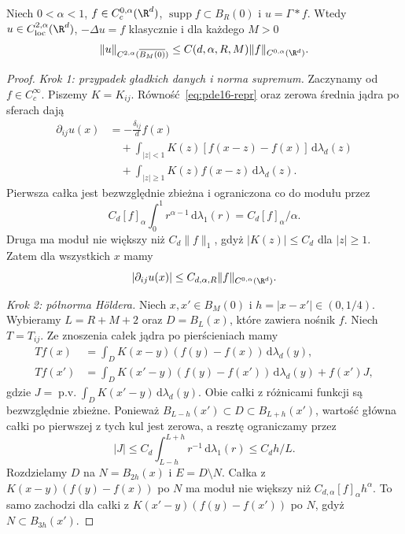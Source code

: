 \begin{lemat}
\label{lem:pde16-newton-holder}
Niech $0<\alpha<1$, $f\in C_c^{0,\alpha}(\R^d)$,
$\operatorname{supp}f\subset B_R(0)$ i $u=\Gamma*f$.
Wtedy $u\in C^{2,\alpha}_{\mathrm{loc}}(\R^d)$,
$-\Delta u=f$ klasycznie i dla każdego $M>0$
\[
 \|u\|_{C^{2,\alpha}(\overline{B_M(0)})}
 \le C(d,\alpha,R,M)\|f\|_{C^{0,\alpha}(\R^d)}.
\]
\end{lemat}
\begin{proof}
\emph{Krok 1: przypadek gładkich danych i norma supremum.}
Zaczynamy od $f\in C_c^\infty$. Piszemy $K=K_{ij}$.
Równość~\eqref{eq:pde16-repr} oraz zerowa średnia jądra
po sferach dają
\begin{equation}\label{eq:pde16-cancel}
 \begin{aligned}
 \partial_{ij}u(x)&=-\frac{\delta_{ij}}d f(x)\\
 &\quad+\int_{|z|<1}K(z)[f(x-z)-f(x)]\,\mathrm d\lambda_d(z)\\
 &\quad+\int_{|z|\ge1}K(z)f(x-z)\,\mathrm d\lambda_d(z).
 \end{aligned}
\end{equation}
Pierwsza całka jest bezwzględnie zbieżna i ograniczona
co do modułu przez
\[
 C_d[f]_\alpha\int_0^1 r^{\alpha-1}\,\mathrm d\lambda_1(r)
 =C_d[f]_\alpha/\alpha.
\]
Druga ma moduł nie większy niż $C_d\|f\|_1$,
gdyż $|K(z)|\le C_d$ dla $|z|\ge1$.
Zatem dla wszystkich $x$ mamy
\[
 |\partial_{ij}u(x)|\le C_{d,\alpha,R}
 \|f\|_{C^{0,\alpha}(\R^d)}.
\]

\emph{Krok 2: półnorma Höldera.}
Niech $x,x'\in B_M(0)$ i $h=|x-x'|\in(0,1/4)$.
Wybieramy $L=R+M+2$ oraz $D=B_L(x)$, które
zawiera nośnik $f$. Niech $T=T_{ij}$.
Ze znoszenia całek jądra po pierścieniach mamy
\[
 \begin{aligned}
 Tf(x)&=\int_D K(x-y)(f(y)-f(x))\,\mathrm d\lambda_d(y),\\
 Tf(x')&=\int_D K(x'-y)(f(y)-f(x'))\,\mathrm d\lambda_d(y)
           +f(x')J,
 \end{aligned}
\]
gdzie $J=\operatorname{p.v.}\int_D K(x'-y)\,\mathrm d\lambda_d(y)$.
Obie całki z różnicami funkcji są bezwzględnie
zbieżne. Ponieważ
$B_{L-h}(x')\subset D\subset B_{L+h}(x')$,
wartość główna całki po pierwszej z tych kul jest
zerowa, a resztę ograniczamy przez
\[
 |J|\le C_d\int_{L-h}^{L+h}r^{-1}\,\mathrm d\lambda_1(r)
 \le C_d h/L .
\]
Rozdzielamy $D$ na $N=B_{2h}(x)$ i $E=D\setminus N$.
Całka z $K(x-y)(f(y)-f(x))$ po $N$ ma moduł
nie większy niż $C_{d,\alpha}[f]_\alpha h^\alpha$.
To samo zachodzi dla całki z $K(x'-y)(f(y)-f(x'))$
po $N$, gdyż $N\subset B_{3h}(x')$.


\end{proof}
